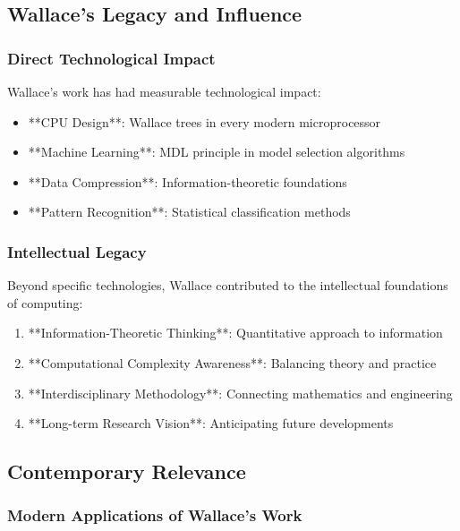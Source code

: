 \subsection{Wallace's Legacy and Influence}

\subsubsection{Direct Technological Impact}

Wallace's work has had measurable technological impact:

\begin{itemize}
    \item **CPU Design**: Wallace trees in every modern microprocessor
    \item **Machine Learning**: MDL principle in model selection algorithms
    \item **Data Compression**: Information-theoretic foundations
    \item **Pattern Recognition**: Statistical classification methods
\end{itemize}

\subsubsection{Intellectual Legacy}

Beyond specific technologies, Wallace contributed to the intellectual foundations of computing:

\begin{enumerate}
    \item **Information-Theoretic Thinking**: Quantitative approach to information
    \item **Computational Complexity Awareness**: Balancing theory and practice
    \item **Interdisciplinary Methodology**: Connecting mathematics and engineering
    \item **Long-term Research Vision**: Anticipating future developments
\end{enumerate}

\subsection{Contemporary Relevance}

\subsubsection{Modern Applications of Wallace's Work}

